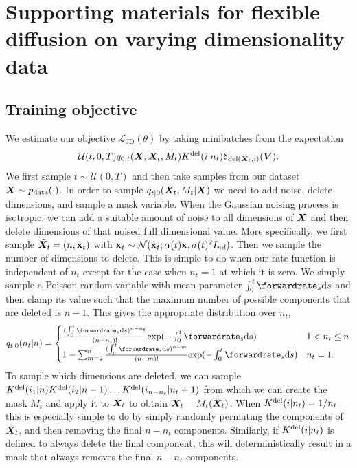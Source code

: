 \chapter{Supporting materials for flexible diffusion on varying dimensionality data}

\section{Training objective}
\label{sec:tddm-ApdxTrainingObjective}
We estimate our objective $\mathcal{L}_\text{JD}(\theta)$ by taking minibatches from the expectation 
\begin{equation}
    \mathcal{U}(t; 0, T) q_{0,t}({\bm{X}}, {\bm{X}}_t, M_t) K^{\textup{del}}(i | n_t) \updelta_{\text{del}({\bm{X}}_t, i)}({\bm{V}}).
\end{equation}
We first sample $t \sim \mathcal{U}(0, T)$ and then take samples from our dataset ${\bm{X}} \sim p_{\rm{data}}(\cdot)$. In order to sample $q_{t|0}({\bm{X}}_t, M_t | {\bm{X}})$ we need to add noise, delete dimensions, and sample a mask variable. When the Gaussian noising process is isotropic, we can add a suitable amount of noise to all dimensions of ${\bm{X}}$ and then delete dimensions of that noised full dimensional value. More specifically, we first sample $\tilde{{\bm{X}}}_t = (n, \tilde{{\mathbf{x}}}_t)$ with $\tilde{{\mathbf{x}}}_t \sim \mathcal{N}(\tilde{{\mathbf{x}}}_t; \alpha(t) {\mathbf{x}}, \sigma(t)^2 I_{n d})$. Then we sample the number of dimensions to delete. This is simple to do when our rate function is independent of $n_t$ except for the case when $n_t=1$ at which it is zero. We simply sample a Poisson random variable with mean parameter $\int_0^t \forwardrate_s \rmd s$ and then clamp its value such that the maximum number of possible components that are deleted is $n - 1$. This gives the appropriate distribution over $n_t$, 
\begin{equation}
    q_{t|0}(n_t | n) = \begin{cases}
         \frac{(\int_0^t \forwardrate_s \rmd s)^{n - n_t}}{(n - n_t)!} \text{exp}(- \int_0^t \forwardrate_s \rmd s)&\textstyle  1 < n_t \leq n \\
        1 -  \sum_{m=2}^{n} \frac{(\int_0^t \forwardrate_s \rmd s)^{n - m}}{(n - m)!} \text{exp}(- \int_0^t \forwardrate_s \rmd s)  &\textstyle  n_t = 1.
    \end{cases}
\end{equation}
To sample which dimensions are deleted, we can sample $K^{\textup{del}}(i_1 | n) K^{\textup{del}}(i_2 | n-1) \dots K^{\textup{del}}(i_{n - n_t} | n_t+1)$ from which we can create the mask $M_t$ and apply it to $\tilde{{\bm{X}}}_t$ to obtain ${\bm{X}}_t = M_t(\tilde{{\bm{X}}}_t)$. When $K^{\textup{del}}(i | n_t) = 1/n_t$ this is especially simple to do by simply randomly permuting the components of $\tilde{{\bm{X}}}_t$, and then removing the final $n - n_t$ components. Similarly, if $K^{\textup{del}}(i | n_t)$ is defined to always delete the final component, this will deterministically result in a mask that always removes the final $n - n_t$ components.

